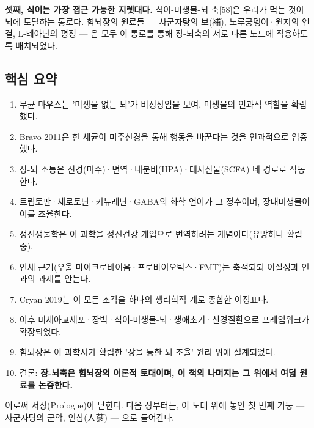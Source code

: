 \documentclass[11pt,oneside]{book}
\begin{document}
\textbf{셋째, 식이는 가장 접근 가능한 지렛대다.} 식이-미생물-뇌 축[58]은 우리가 먹는 것이 뇌에 도달하는 통로다. 힘뇌장의 원료들 — 사군자탕의 보(補), 노루궁뎅이·원지의 연결, L-테아닌의 평정 — 은 모두 이 통로를 통해 장-뇌축의 서로 다른 노드에 작용하도록 배치되었다.

\subsection{핵심 요약}
\begin{enumerate}[leftmargin=6mm,itemsep=1pt,topsep=2pt]
  \item 무균 마우스는 '미생물 없는 뇌'가 비정상임을 보여, 미생물의 인과적 역할을 확립했다.
  \item Bravo 2011은 한 세균이 미주신경을 통해 행동을 바꾼다는 것을 인과적으로 입증했다.
  \item 장-뇌 소통은 신경(미주)·면역·내분비(HPA)·대사산물(SCFA) 네 경로로 작동한다.
  \item 트립토판·세로토닌·키뉴레닌·GABA의 화학 언어가 그 정수이며, 장내미생물이 이를 조율한다.
  \item 정신생물학은 이 과학을 정신건강 개입으로 번역하려는 개념이다(유망하나 확립 중).
  \item 인체 근거(우울 마이크로바이옴·프로바이오틱스·FMT)는 축적되되 이질성과 인과의 과제를 안는다.
  \item Cryan 2019는 이 모든 조각을 하나의 생리학적 계로 종합한 이정표다.
  \item 이후 미세아교세포·장벽·식이-미생물-뇌·생애초기·신경질환으로 프레임워크가 확장되었다.
  \item 힘뇌장은 이 과학사가 확립한 '장을 통한 뇌 조율' 원리 위에 설계되었다.
  \item 결론: \textbf{장-뇌축은 힘뇌장의 이론적 토대이며, 이 책의 나머지는 그 위에서 여덟 원료를 논증한다.}
\end{enumerate}
이로써 서장(Prologue)이 닫힌다. 다음 장부터는, 이 토대 위에 놓인 첫 번째 기둥 — 사군자탕의 군약, 인삼(人蔘) — 으로 들어간다.
\end{document}
